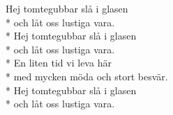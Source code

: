 \begin{SongText}
    \begin{SongVerse}
        Hej tomtegubbar slå i glasen\\*%
        och låt oss lustiga vara.\\*%
        Hej tomtegubbar slå i glasen\\*%
        och låt oss lustiga vara.\\*%
        En liten tid vi leva här\\*%
        med mycken möda och stort besvär.\\*%
        Hej tomtegubbar slå i glasen\\*%
        och låt oss lustiga vara.
    \end{SongVerse}
\end{SongText}